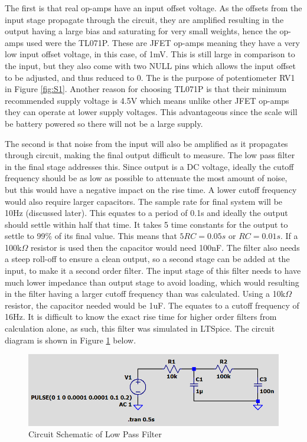 \documentclass[class=report,11pt,crop=false]{standalone}
\begin{document}
	The first is that real op-amps have an input offset voltage. As the offsets from the input stage propagate through the circuit, they are amplified resulting in the output having a large bias and saturating for very small weights, hence the op-amps used were the TL071P. These are JFET op-amps meaning they have a very low input offset voltage, in this case, of 1mV. This is still large in comparison to the input, but they also come with two NULL pins which allows the input offset to be adjusted, and thus reduced to 0. The is the purpose of potentiometer RV1 in Figure \ref{fig:S1}. Another reason for choosing TL071P is that their minimum recommended supply voltage is 4.5V which means unlike other JFET op-amps they can operate at lower supply voltages. This advantageous since the scale will be battery powered so there will not be a large supply.
	
	The second is that noise from the input will also be amplified as it propagates through circuit, making the final output difficult to measure. The low pass filter in the final stage addresses this. Since output is a DC voltage, ideally the cutoff frequency should be as low as possible to attenuate the most amount of noise, but this would have a negative impact on the rise time. A lower cutoff frequency would also require larger capacitors. The sample rate for final system will be 10Hz (discussed later). This equates to a period of 0.1s and ideally the output should settle within half that time. It takes 5 time constants for the output to settle to 99\% of its final value. This means that $5RC = 0.05s$ or $RC = 0.01s$. If a 100k$\Omega$ resistor is used then the capacitor would need 100nF. The filter also needs a steep roll-off to ensure a clean output, so a second stage can be added at the input, to make it a second order filter. The input stage of this filter needs to have much lower impedance than output stage to avoid loading, which would resulting in the filter having a larger cutoff frequency than was calculated. Using a 10k$\Omega$ resistor, the capacitor needed would be 1uF. The equates to a cutoff frequency of 16Hz. It is difficult to know the exact rise time for higher order filters from calculation alone, as such, this filter was simulated in LTSpice. The circuit diagram is shown in Figure \ref{fig:S2} below.
	
	\begin{figure}[h!]
		\centering
		\includegraphics[width=0.5\linewidth]{Figures/Filter.png}
		\caption{Circuit Schematic of Low Pass Filter}
		\label{fig:S2}
	\end{figure}
	
\end{document}
